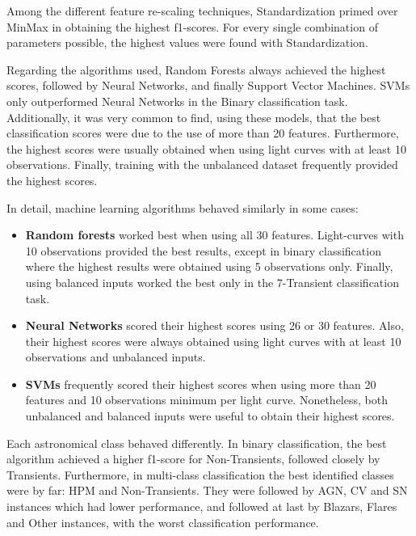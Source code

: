 \documentclass[a4paper,fleqn,usenatbib]{mnras}
\begin{document}

Among the different feature re-scaling techniques, Standardization primed over MinMax in obtaining the highest f1-scores. For every single combination of parameters possible, the highest values were found with Standardization.

Regarding the algorithms used, Random Forests always achieved the highest scores, followed by Neural Networks, and finally Support Vector Machines. SVMs only outperformed Neural Networks in the Binary classification task. Additionally, it was very common to find, using these models, that the best classification scores were due to the use of more than 20 features. Furthermore, the highest scores were usually obtained when using light curves with at least 10 observations. Finally, training with the unbalanced dataset frequently provided the highest scores.

In detail, machine learning algorithms behaved similarly in some cases:

\begin{itemize}
    \item \textbf{Random forests} worked best when using all 30 features. Light-curves with 10 observations provided the best results, except in binary classification where the highest results were obtained using 5 observations only. Finally, using balanced inputs worked the best only in the 7-Transient classification task. 
    \item \textbf{Neural Networks} scored their highest scores using 26 or 30 features. Also, their highest scores were always obtained using light curves with at least 10 observations and unbalanced inputs.
    \item \textbf{SVMs} frequently scored their highest scores when using more than 20 features and 10 observations minimum per light curve. Nonetheless, both unbalanced and balanced inputs were useful to obtain their highest scores.
\end{itemize}

Each astronomical class behaved differently. In binary classification, the best algorithm achieved a higher f1-score for Non-Transients, followed closely by Transients. Furthermore, in multi-class classification the best identified classes were by far: HPM and Non-Transients. They were followed by AGN, CV and SN instances which had lower performance, and followed at last by Blazars, Flares and Other instances, with the worst classification performance. 
\end{document}
